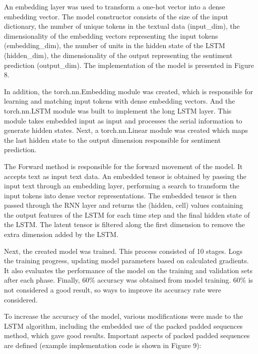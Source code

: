 \begin{multicols}{2}
An embedding layer was used to transform a one-hot vector into a dense
embedding vector. The model constructor consists of the size of the
input dictionary, the number of unique tokens in the textual data
(input\_dim), the dimensionality of the embedding vectors representing
the input tokens (embedding\_dim), the number of units in the hidden
state of the LSTM (hidden\_dim), the dimensionality of the output
representing the sentiment prediction (output\_dim). The implementation
of the model is presented in Figure 8.

In addition, the torch.nn.Embedding module was created, which is
responsible for learning and matching input tokens with dense embedding
vectors. And the torch.nn.LSTM module was built to implement the long
LSTM layer. This module takes embedded input as input and processes the
serial information to generate hidden states. Next, a torch.nn.Linear
module was created which maps the last hidden state to the output
dimension responsible for sentiment prediction.

The Forward method is responsible for the forward movement of the model.
It accepts text as input text data. An embedded tensor is obtained by
passing the input text through an embedding layer, performing a search
to transform the input tokens into dense vector representations. The
embedded tensor is then passed through the RNN layer and returns the
(hidden, cell) values containing the output features of the LSTM for
each time step and the final hidden state of the LSTM. The latent tensor
is filtered along the first dimension to remove the extra dimension
added by the LSTM.

Next, the created model was trained. This process consisted of 10
stages. Logs the training progress, updating model parameters based on
calculated gradients. It also evaluates the performance of the model on
the training and validation sets after each phase. Finally, 60\%
accuracy was obtained from model training. 60\% is not considered a good
result, so ways to improve its accuracy rate were considered.

To increase the accuracy of the model, various modifications were made
to the LSTM algorithm, including the embedded use of the packed padded
sequences method, which gave good results. Important aspects of packed
padded sequences are defined (example implementation code is shown in
Figure 9):


\end{multicols}
